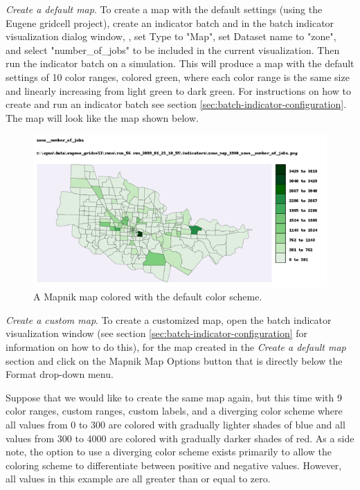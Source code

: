 \clearpage
{}

\emph{Create a default map}. To create a map with the default settings 
(using the Eugene gridcell project), create an indicator batch and 
in the batch indicator visualization dialog window, , set Type to 
"Map", set Dataset name to "zone", and select "number_of_jobs" to be 
included in the current visualization.  Then run the indicator batch on 
a simulation. This will produce a map with the default 
settings of 10 color ranges, colored green, where each color range is 
the same size and linearly increasing from light green to dark green.
For instructions on how to create and run an indicator batch see section
\ref{sec:batch-indicator-configuration}. The map will look like the 
map shown below.

\begin{figure}[ht]
\begin{center}
\includegraphics[width=\textwidth]{part-gui/images/sample-map-default-settings.png}
\end{center}
\caption{A Mapnik map colored with the default color scheme.}
\label{fig:sample-map-default-settings}
\end{figure}
\clearpage

\emph{Create a custom map}. To create a customized map, 
open the batch indicator visualization window (see section 
\ref{sec:batch-indicator-configuration} for information on 
how to do this), for the map created in the \emph{Create a default map}
section and click on the Mapnik Map Options button that is directly 
below the Format drop-down menu.

Suppose that we would like to create the same map again, but this time 
with 9 color ranges, custom ranges, custom labels, and a diverging color 
scheme where all values from 0 to 300 are colored with gradually lighter 
shades of blue and all values from 300 to 4000 are colored with gradually 
darker shades of red. As a side note, the option to use a diverging color 
scheme exists primarily to allow the coloring scheme to differentiate 
between positive and negative values.  However, all values in 
this example are all greater than or equal to zero.


